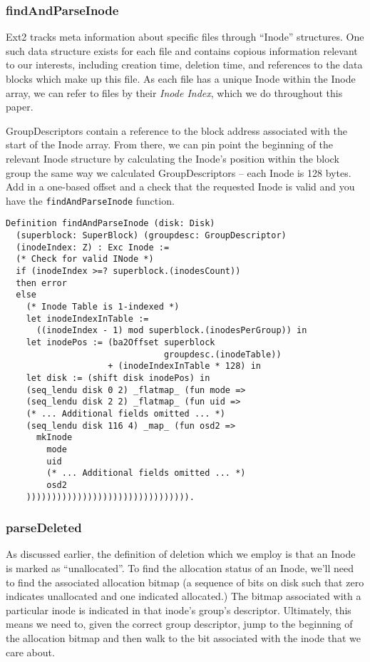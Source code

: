 \documentclass[nocopyrightspace]{sigplanconf}
\begin{document}
\subsubsection{findAndParseInode}

Ext2 tracks meta information about specific files through ``Inode''
structures. One such data structure exists for each file and contains copious
information relevant to our interests, including creation time, deletion time,
and references to the data blocks which make up this file. As each file has a
unique Inode within the Inode array, we can refer to files by their {\it Inode
Index}, which we do throughout this paper.

GroupDescriptors contain a reference to the block address associated with the
start of the Inode array. From there, we can pin point the beginning of the
relevant Inode structure by calculating the Inode's position within the block
group the same way we calculated GroupDescriptors -- each Inode is 128 bytes.
Add in a one-based offset and a check that the requested Inode is valid and
you have the {\tt findAndParseInode} function.

\begin{lstlisting}
Definition findAndParseInode (disk: Disk) 
  (superblock: SuperBlock) (groupdesc: GroupDescriptor)
  (inodeIndex: Z) : Exc Inode :=
  (* Check for valid INode *)
  if (inodeIndex >=? superblock.(inodesCount))
  then error
  else
    (* Inode Table is 1-indexed *)
    let inodeIndexInTable := 
      ((inodeIndex - 1) mod superblock.(inodesPerGroup)) in
    let inodePos := (ba2Offset superblock
                               groupdesc.(inodeTable))
                    + (inodeIndexInTable * 128) in
    let disk := (shift disk inodePos) in
    (seq_lendu disk 0 2) _flatmap_ (fun mode =>
    (seq_lendu disk 2 2) _flatmap_ (fun uid =>
    (* ... Additional fields omitted ... *)
    (seq_lendu disk 116 4) _map_ (fun osd2 =>
      mkInode
        mode
        uid
        (* ... Additional fields omitted ... *)
        osd2
    )))))))))))))))))))))))))))))))).
\end{lstlisting}


\subsubsection{parseDeleted}
As discussed earlier, the definition of deletion which we employ is that an
Inode is marked as ``unallocated''. To find the allocation status of an Inode,
we'll need to find the associated allocation bitmap (a sequence of bits on
disk such that zero indicates unallocated and one indicated allocated.) The
bitmap associated with a particular inode is indicated in that inode's group's
descriptor. Ultimately, this means we need to, given the correct group
descriptor, jump to the beginning of the allocation bitmap and then walk to
the bit associated with the inode that we care about.
\end{document}
